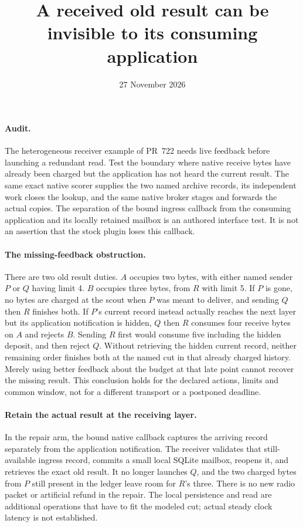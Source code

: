 \documentclass[11pt]{article}
\title{A received old result can be invisible to its consuming application}
\date{27 November 2026}
\begin{document}
\maketitle
\paragraph{Audit.}
The heterogeneous receiver example of PR~722 needs live
feedback before launching a redundant read. Test the boundary
where native receive bytes have already been charged but the
application has not heard the current result. The same exact
native scorer supplies the two named archive records, its
independent work closes the lookup, and the same native broker
stages and forwards the actual copies. The separation of the
bound ingress callback from the consuming application and
its locally retained mailbox is an authored interface test.
It is not an assertion that the stock plugin loses this callback.

\paragraph{The missing-feedback obstruction.}
There are two old result duties. \(A\) occupies two bytes,
with either named sender \(P\) or \(Q\) having limit 4.
\(B\) occupies three bytes, from \(R\) with limit 5.
If \(P\) is gone, no bytes are charged at the scout when
\(P\) was meant to deliver, and sending \(Q\) then \(R\)
finishes both. If \(P\)'s current record instead actually
reaches the next layer but its application notification is
hidden, \(Q\) then \(R\) consumes four receive bytes on \(A\)
and rejects \(B\). Sending \(R\) first would consume five
including the hidden deposit, and then reject \(Q\).
Without retrieving the hidden current record, neither remaining
order finishes both at the named cut in that already charged
history. Merely using better feedback about the budget at that
late point cannot recover the missing result. This conclusion
holds for the declared actions, limits and common window, not
for a different transport or a postponed deadline.

\paragraph{Retain the actual result at the receiving layer.}
In the repair arm, the bound native callback captures the
arriving record separately from the application notification.
The receiver validates that still-available ingress record,
commits a small local SQLite mailbox, reopens it, and retrieves
the exact old result.
It no longer launches \(Q\), and the two charged bytes from
\(P\) still present in the ledger leave room for \(R\)'s three.
There is no new radio packet or artificial refund in the
repair. The local persistence and read are additional
operations that have to fit the modeled cut; actual steady
clock latency is not established.
\end{document}
